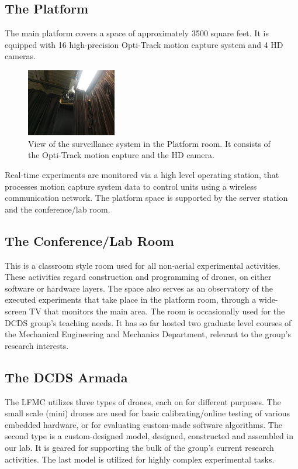 \documentclass[english,letter,12pt,onesided]{article}
\theoremstyle{definition}
\begin{document}
\subsection*{The Platform} The main platform covers a space of approximately 3500 square feet. It is equipped with 16 high-precision Opti-Track motion capture system and 4 HD cameras. \begin{figure} 
\center
    \includegraphics[width=0.35\textwidth]{IMAG1089} 
    \caption*{View of the surveillance system in the Platform room. It consists of the Opti-Track motion capture and the HD camera.}\vspace{-0.5in}
\end{figure} Real-time experiments are monitored via a high level operating station, that processes motion capture system data to control units using a wireless communication network. The platform space is supported by the server station and the conference/lab room. 



\subsection*{The Conference/Lab Room}
This is a classroom style room used for all non-aerial experimental activities. These activities regard construction and programming of drones, on either software or hardware layers. The space also serves as an observatory of the executed experiments that take place in the platform room, through a wide-screen TV that monitors the main area. The room is occasionally used for the DCDS group's teaching needs. It has so far hosted two graduate level courses of the Mechanical Engineering and Mechanics Department, relevant to the group's research interests.

\subsection*{The DCDS Armada}
The LFMC utilizes three types of drones, each on for different purposes. The small scale (mini) drones are used for basic calibrating/online testing of various embedded hardware, or for evaluating custom-made software algorithms. The second type is a custom-designed model, designed, constructed and assembled in our lab. It is geared for supporting the bulk of the group's current research activities. The last model is utilized for highly complex experimental tasks.   
\end{document}

